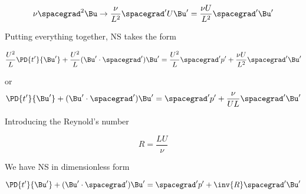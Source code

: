 \begin{equation}\label{eqn:continuumL14:430}
\nu \spacegrad^2 \Bu \rightarrow \frac{\nu}{L^2} \spacegrad' U \Bu' = \frac{\nu U}{L^2} \spacegrad' \Bu'
\end{equation}

Putting everything together, NS takes the form

\begin{equation}\label{eqn:continuumL14:450}
\frac{U^2}{L} \PD{t'}{\Bu'} + \frac{U^2}{L} (\Bu' \cdot \spacegrad') \Bu' = \frac{U^2}{L} \spacegrad' p' + \frac{\nu U}{L^2} \spacegrad' \Bu'
\end{equation}

or
\begin{equation}\label{eqn:continuumL14:470}
\PD{t'}{\Bu'} + (\Bu' \cdot \spacegrad') \Bu' = \spacegrad' p' + \frac{\nu}{U L} \spacegrad' \Bu'
\end{equation}

Introducing the Reynold's number

\begin{equation}\label{eqn:continuumL14:490}
R = \frac{L U}{\nu}
\end{equation}

We have NS in dimensionless form

\begin{equation}\label{eqn:continuumL14:510}
\PD{t'}{\Bu'} + (\Bu' \cdot \spacegrad') \Bu' = \spacegrad' p' + \inv{R} \spacegrad' \Bu'
\end{equation}


\EndNoBibArticle
